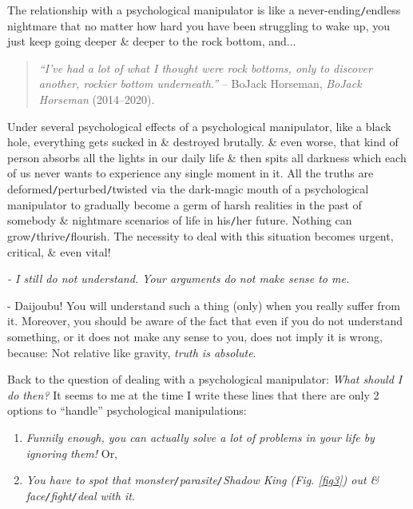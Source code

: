 \documentclass[12pt,oneside]{book}
\begin{document}
The relationship with a psychological manipulator is like a never-ending{\tt/}endless nightmare that no matter how hard you have been struggling to wake up, you just keep going deeper \& deeper to the rock bottom, and$\ldots$
\begin{quotation}
	{\it``I've had a lot of what I thought were rock bottoms, only to discover another, rockier bottom underneath.''} -- BoJack Horseman, {\it BoJack Horseman} (2014--2020).
\end{quotation}
Under several psychological effects of a psychological manipulator, like a black hole, everything gets sucked in \& destroyed brutally. \& even worse, that kind of person absorbs all the lights in our daily life \& then spits all darkness which each of us never wants to experience any single moment in it. All the truths are deformed{\tt/}perturbed{\tt/}twisted via the dark-magic mouth of a psychological manipulator to gradually become a germ of harsh realities in the past of somebody \& nightmare scenarios of life in his{\tt/}her future. Nothing can grow{\tt/}thrive{\tt/}flourish. The necessity to deal with this situation becomes urgent, critical, \& even vital!

{\it - I still do not understand. Your arguments do not make sense to me.}

- Daijoubu! You will understand such a thing (only) when you really suffer from it. Moreover, you should be aware of the fact that even if you do not understand something, or it does not make any sense to you, does not imply it is wrong, because: Not relative like gravity, {\it truth is absolute}.

Back to the question of dealing with a psychological manipulator: {\it What should I do then?} It seems to me at the time I write these lines that there are only 2 options to ``handle'' psychological manipulations:
\begin{enumerate}
	\item {\it Funnily enough, you can actually solve a lot of problems in your life by ignoring them!} Or,
	\item {\it You have to spot that monster{\tt/}parasite{\tt/}Shadow King (Fig. \ref{fig3}) out \& face{\tt/}fight{\tt/}deal with it.}
\end{enumerate}
\end{document}
